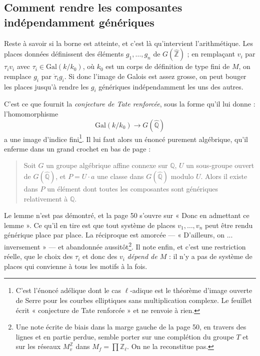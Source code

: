 \documentclass[11pt,a4paper]{article}
\begin{document}
\subsection*{Comment rendre les composantes indépendamment génériques}

Reste à savoir si la borne est atteinte, et c'est là qu'intervient l'arithmétique.
Les places données définissent des éléments $g_{1}, \ldots, g_{n}$ de
$G(\widehat{\mathbb{Z}})$ ; en remplaçant $v_{i}$ par $\tau_{i} v_{i}$ avec
$\tau_{i} \in \mathrm{Gal}(k/k_{0})$, où $k_{0}$ est un corps de définition de
type fini de $M$, on remplace $g_{i}$ par $\dot{\tau}_{i} g_{i}$. Si donc
l'image de Galois est assez grosse, on peut bouger les places jusqu'à rendre les
$g_{i}$ génériques indépendamment les uns des autres.

C'est ce que fournit la \emph{conjecture de Tate renforcée}, sous la forme qu'il
lui donne : l'homomorphisme
\[
  \mathrm{Gal}(k/k_{0}) \longrightarrow G(\widehat{\mathbb{Q}})
\]
a une image d'indice fini\footnote{C'est l'énoncé adélique dont le cas
$\ell$-adique est le théorème d'image ouverte de Serre pour les courbes
elliptiques sans multiplication complexe. Le feuillet écrit « conjecture de Tate
renforcée » et ne renvoie à rien.}. Il lui faut alors un énoncé purement
algébrique, qu'il enferme dans un grand crochet en bas de page :

\begin{quote}
Soit $G$ un groupe algébrique affine connexe sur $\mathbb{Q}$, $U$ un
sous-groupe ouvert de $G(\widehat{\mathbb{Q}})$, et $P = U\!\cdot\!a$ une classe
dans $G(\widehat{\mathbb{Q}})$ modulo $U$. Alors il existe dans $P$ un élément
dont toutes les composantes sont génériques relativement à $\mathbb{Q}$.
\end{quote}

Le lemme n'est pas démontré, et la page 50 s'ouvre sur « Donc en admettant ce
lemme ». Ce qu'il en tire est que tout système de places $v_{1}, \ldots, v_{n}$
peut être rendu générique place par place. La réciproque est amorcée
— « D'ailleurs, on ... inversement » — et abandonnée
aussitôt\footnote{Une note écrite de biais dans la marge gauche de la page 50,
en travers des lignes et en partie perdue, semble porter sur une complétion du
groupe $T$ et sur les réseaux $M^{\mathbb{Z}}_{v}$ dans
$M_{f} = \prod \mathbb{Z}_{\ell}$. On ne la reconstitue pas.}. Il note enfin, et
c'est une restriction réelle, que le choix des $\tau_{i}$ et donc des $v_{i}$
\emph{dépend de $M$} : il n'y a pas de système de places qui convienne à tous
les motifs à la fois.
\end{document}

